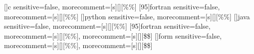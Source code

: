 []{c}{%
	sensitive=false,
	morecomment=[s][\color{red}]{[\%}{\%]}
}
[95]{fortran}{%
	sensitive=false,
	morecomment=[s][\color{red}]{[\%}{\%]}
}
[]{python}{%
	sensitive=false,
	morecomment=[s][\color{red}]{[\%}{\%]}
}
[]{java}{%
	sensitive=false,
	morecomment=[s][\color{red}]{[\%}{\%]}
}
[95]{fortran}{%
	sensitive=false,
	morecomment=[s][\color{red}]{[\%}{\%]},
	morecomment=[s][\color{red}]{[\$}{\$]}
}
[]{form}{%
	sensitive=false,
	morecomment=[s][\color{red}]{[\%}{\%]},
	morecomment=[s][\color{red}]{[\$}{\$]}
}
